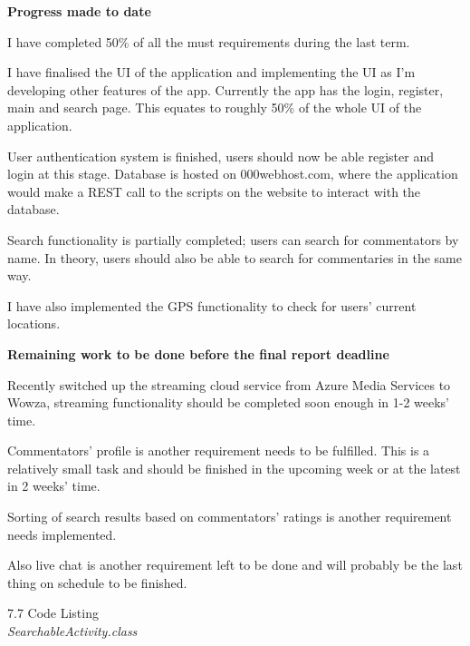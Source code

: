 \documentclass{article}
\begin{document}
\begin{flushleft}
{\large \textbf{Progress made to date}}\par
I have completed 50\% of all the must requirements during the last term.\par
I have finalised the UI of the application and implementing the UI as I’m developing other features of the app. Currently the app has the login, register, main and search page. This equates to roughly 50\% of the whole UI of the application.\par
User authentication system is finished, users should now be able register and login at this stage. Database is hosted on 000webhost.com, where the application would make a REST call to the scripts on the website to interact with the database.\par
Search functionality is partially completed; users can search for commentators by name. In theory, users should also be able to search for commentaries in the same way.\par
I have also implemented the GPS functionality to check for users’ current locations.\par
{\large \textbf{Remaining work to be done before the final report deadline}}\par
Recently switched up the streaming cloud service from Azure Media Services to Wowza, streaming functionality should be completed soon enough in 1-2 weeks’ time.\par
Commentators’ profile is another requirement needs to be fulfilled. This is a relatively small task and should be finished in the upcoming week or at the latest in 2 weeks’ time.\par
Sorting of search results based on commentators’ ratings is another requirement needs implemented.\par
Also live chat is another requirement left to be done and will probably be the last thing on schedule to be finished.\par
{\Large 7.7 Code Listing}\\
{\large \textit{SearchableActivity.class}}
\end{flushleft}
\end{document}
